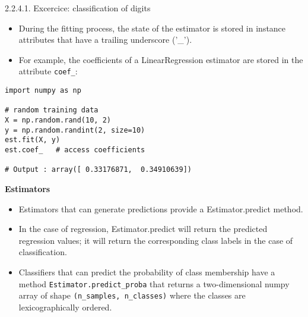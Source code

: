 2.2.4.1. Excercice: classification of digits\documentclass[MASTER.tex]{subfiles}
\begin{document}


\Large
\begin{itemize}
\item During the fitting process, the state of the estimator is stored in instance attributes that have a trailing underscore ('\_'). 
\item For example, the coefficients of a LinearRegression estimator are stored in the attribute \texttt{coef\_}:
\end{itemize}



\begin{framed}
\begin{verbatim}
import numpy as np

# random training data
X = np.random.rand(10, 2)
y = np.random.randint(2, size=10)
est.fit(X, y)
est.coef_   # access coefficients

# Output : array([ 0.33176871,  0.34910639])
\end{verbatim}
\end{framed}


	\textbf{Estimators}
\Large
\begin{itemize}
\item Estimators that can generate predictions provide a Estimator.predict method.
\item In the case of regression, Estimator.predict will return the predicted regression values; it will return the corresponding class labels in the case of classification.
\item  Classifiers that can predict the probability of class membership have a method \texttt{Estimator.predict\_proba} that returns a two-dimensional numpy array of shape \texttt{(n\_samples, n\_classes)} where the classes are lexicographically ordered.
\end{itemize}



%
%
%
\end{document}
